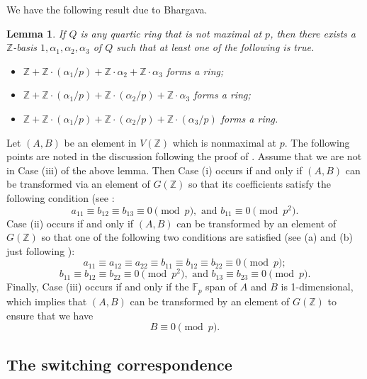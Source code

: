 \documentclass{article}
\def\Z{{\mathbb Z}}
\def\F{{\mathbb F}}
\def\Z{{\mathbb Z}}
\def\F{{\mathbb F}}
\newtheorem{lemma}[theorem]{Lemma}
\begin{document}
We have the following result due to Bhargava.
\begin{lemma}\cite[Lemma 22]{BHCL3}\label{lem:nonmax_Manjul}
If $Q$ is any quartic ring that is not maximal at $p$, then there exists a $\Z$-basis $1,\alpha_1,\alpha_2,\alpha_3$ of $Q$ such that at least one of the following is true.
\begin{itemize}
\item[{\rm (i)}] $\Z+\Z\cdot(\alpha_1/p)+\Z\cdot\alpha_2+\Z\cdot\alpha_3$ forms a ring;
\item[{\rm (ii)}] $\Z+\Z\cdot(\alpha_1/p)+\Z\cdot(\alpha_2/p)+\Z\cdot\alpha_3$ forms a ring;
\item[{\rm (iii)}] $\Z+\Z\cdot(\alpha_1/p)+\Z\cdot(\alpha_2/p)+\Z\cdot(\alpha_3/p)$ forms a ring.
\end{itemize}
\end{lemma}

Let $(A,B)$ be an element in $V(\Z)$ which is nonmaximal at $p$. The following points are noted in the discussion following the proof of \cite[Lemma 22]{BHCL3}. Assume that we are not in Case (iii) of the above lemma. Then Case (i) occurs if and only if $(A,B)$ can be transformed via an element of $G(\Z)$ so that its coefficients satisfy the following condition (see \cite[(43)]{BHCL3}:
\begin{equation}\label{eq:SW_Condition_1}
a_{11}\equiv b_{12}\equiv b_{13}\equiv 0\pmod{p},\mbox{ and }
b_{11}\equiv 0 \pmod{p^2}.
\end{equation}
Case (ii) occurs if and only if $(A,B)$ can be transformed by an element of $G(\Z)$ so that one of the following two conditions are satisfied (see (a) and (b) just following \cite[(43)]{BHCL3}):
\begin{equation}\label{eq:SW_Condition_2}
a_{11}\equiv a_{12}\equiv a_{22}\equiv b_{11}\equiv b_{12}\equiv b_{22}
\equiv 0 \pmod{p};
\end{equation}
\begin{equation}\label{eq:SW_Condition_2'}
b_{11}\equiv b_{12}\equiv b_{22}\equiv 0\pmod{p^2},\mbox{ and }
b_{13}\equiv b_{23}\equiv 0 \pmod{p}.
\end{equation}
Finally, Case (iii) occurs if and only if the $\F_p$ span of $A$ and $B$ is 1-dimensional, which implies that $(A,B)$ can be transformed by an element of $G(\Z)$ to ensure that we have
\begin{equation}\label{eq:SW_Condition_3}
B\equiv 0 \pmod{p}.
\end{equation}

\subsection{The switching correspondence}
\end{document}
